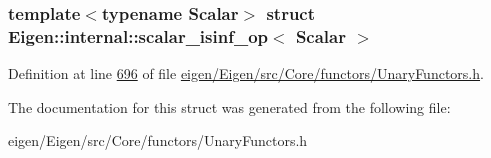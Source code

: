 \subsubsection*{template$<$typename Scalar$>$\newline
struct Eigen\+::internal\+::scalar\+\_\+isinf\+\_\+op$<$ Scalar $>$}



Definition at line \hyperlink{eigen_2_eigen_2src_2_core_2functors_2_unary_functors_8h_source_l00696}{696} of file \hyperlink{eigen_2_eigen_2src_2_core_2functors_2_unary_functors_8h_source}{eigen/\+Eigen/src/\+Core/functors/\+Unary\+Functors.\+h}.



The documentation for this struct was generated from the following file\+:\begin{DoxyCompactItemize}
\item 
eigen/\+Eigen/src/\+Core/functors/\+Unary\+Functors.\+h\end{DoxyCompactItemize}
